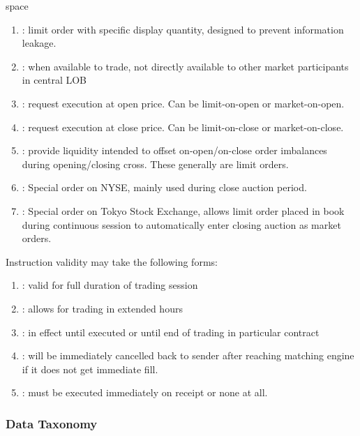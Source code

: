 \begin{definition} {\color{white}space}
\begin{enumerate}[label=\roman*.]
\item {}: limit order with specific display quantity, designed to prevent information leakage.
\item {}: when available to trade, not directly available to other market participants in central LOB
\item {}: request execution at open price. Can be limit-on-open or market-on-open.
\item {}: request execution at close price. Can be limit-on-close or market-on-close.
\item {}: provide liquidity intended to offset on-open/on-close order imbalances during opening/closing cross. These generally are limit orders.
\item {}: Special order on NYSE, mainly used during close auction period.
\item {}: Special order on Tokyo Stock Exchange, allows limit order placed in book during continuous session to automatically enter closing auction as market orders.
\end{enumerate}
\end{definition}

Instruction validity may take the following forms:
\begin{enumerate}[label=\roman*.]
\setlength{\itemsep}{0pt}
\item {}: valid for full duration of trading session
\item {}: allows for trading in extended hours
\item {}: in effect until executed or until end of trading in particular contract
\item {}: will be immediately cancelled back to sender after reaching matching engine if it does not get immediate fill.
\item {}: must be executed immediately on receipt or none at all.
\end{enumerate}

\subsubsection{Data Taxonomy}


